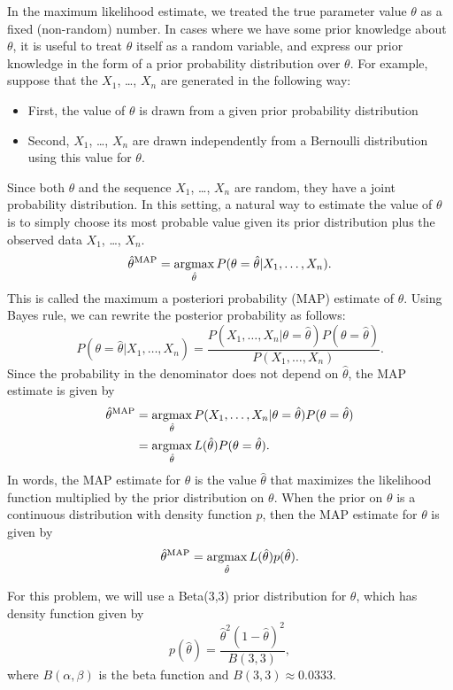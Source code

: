 \documentclass{article}
\newcommand \map [1]{{\hat #1}^{\rm MAP}}
\newcommand \argmax {\operatorname*{argmax}}
\begin{document}
In the maximum likelihood estimate, we treated the true parameter
value $\theta$ as a fixed (non-random) number. In cases where we have
some prior knowledge about $\theta$, it is useful to treat $\theta$
itself as a random variable, and express our prior knowledge in the
form of a prior probability distribution over $\theta$.  For example,
suppose that the $X_1$, \dots, $X_n$ are generated in the following
way:
\begin{itemize}
\item First, the value of $\theta$ is drawn from a given prior
  probability distribution
\item Second, $X_1$, \dots, $X_n$ are drawn independently from a
  Bernoulli distribution using this value for $\theta$.
\end{itemize}
Since both $\theta$ and the sequence $X_1$, \dots, $X_n$ are random,
they have a joint probability distribution. In this setting, a natural
way to estimate the value of $\theta$ is to simply choose its most
probable value given its prior distribution plus the observed data
$X_1$, \dots, $X_n$.
\[
\map{\theta} = \argmax_{\hat \theta} P(\theta = \hat \theta | X_1, \dots, X_n).
\]
This is called the maximum a posteriori probability (MAP) estimate of
$\theta$. Using Bayes rule, we can rewrite the posterior probability
as follows:
\[
P(\theta = \hat \theta | X_1, \dots, X_n)
=
\frac{P(X_1, \dots, X_n | \theta = \hat \theta) P(\theta = \hat \theta)}
{P(X_1, \dots, X_n)}.
\]
Since the probability in the denominator does not depend on
$\hat \theta$, the MAP estimate is given by
\begin{align*}
\map{\theta} &= \argmax_{\hat \theta} 
               P(X_1, \dots, X_n | \theta = \hat\theta)
               P(\theta = \hat \theta)\\
             &= \argmax_{\hat \theta} L(\hat \theta)
               P(\theta = \hat\theta).
\end{align*}
In words, the MAP estimate for $\theta$ is the value $\hat \theta$
that maximizes the likelihood function multiplied by the prior
distribution on $\theta$. When the prior on $\theta$ is a continuous
distribution with density function $p$, then the MAP estimate for
$\theta$ is given by
\[
\map{\theta} = \argmax_{\hat \theta} L(\hat \theta) p(\hat \theta).
\]

For this problem, we will use a Beta(3,3) prior distribution for
$\theta$, which has density function given by
\[
p(\hat \theta) = \frac{\hat\theta^2 (1-\hat\theta)^2}{B(3,3)},
\]
where $B(\alpha, \beta)$ is the beta function and
$B(3,3) \approx 0.0333$.
\end{document}
